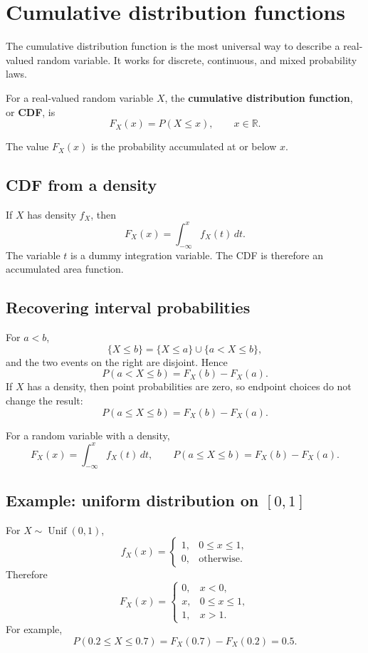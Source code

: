 \section{Cumulative distribution functions}

The cumulative distribution function is the most universal way to describe a
real-valued random variable. It works for discrete, continuous, and mixed
probability laws.

\begin{definitionbox}
For a real-valued random variable \(X\), the \textbf{cumulative distribution
function}, or \textbf{CDF}, is
\[
F_X(x)=P(X\leq x),
\qquad x\in\mathbb R.
\]
\end{definitionbox}

The value \(F_X(x)\) is the probability accumulated at or below \(x\).

\subsection*{CDF from a density}

If \(X\) has density \(f_X\), then
\[
F_X(x)=\int_{-\infty}^{x}f_X(t)\,dt.
\]
The variable \(t\) is a dummy integration variable. The CDF is therefore an
accumulated area function.

\subsection*{Recovering interval probabilities}

For \(a<b\),
\[
\{X\leq b\}=\{X\leq a\}\cup\{a<X\leq b\},
\]
and the two events on the right are disjoint. Hence
\[
P(a<X\leq b)=F_X(b)-F_X(a).
\]
If \(X\) has a density, then point probabilities are zero, so endpoint choices do
not change the result:
\[
P(a\leq X\leq b)=F_X(b)-F_X(a).
\]

\begin{theorembox}
For a random variable with a density,
\[
F_X(x)=\int_{-\infty}^{x}f_X(t)\,dt,
\qquad
P(a\leq X\leq b)=F_X(b)-F_X(a).
\]
\end{theorembox}

\subsection*{Example: uniform distribution on \([0,1]\)}

For \(X\sim\operatorname{Unif}(0,1)\),
\[
f_X(x)=
\begin{cases}
1, & 0\leq x\leq1,\\
0, & \text{otherwise}.
\end{cases}
\]
Therefore
\[
F_X(x)=
\begin{cases}
0, & x<0,\\
x, & 0\leq x\leq1,\\
1, & x>1.
\end{cases}
\]
For example,
\[
P(0.2\leq X\leq0.7)=F_X(0.7)-F_X(0.2)=0.5.
\]

